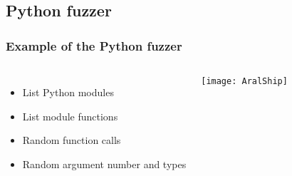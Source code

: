 \subsection{Python fuzzer}
\frame
{
    \frametitle{Example of the Python fuzzer}
    \begin{columns}[c]
        \column{2.3in}
            \begin{itemize}
            \item List Python modules
            \item List module functions
            \item Random function calls
            \item Random argument number and types
            \end{itemize}

        \column{2.3in}
            \texttt{[image: AralShip]}
    \end{columns}
}

